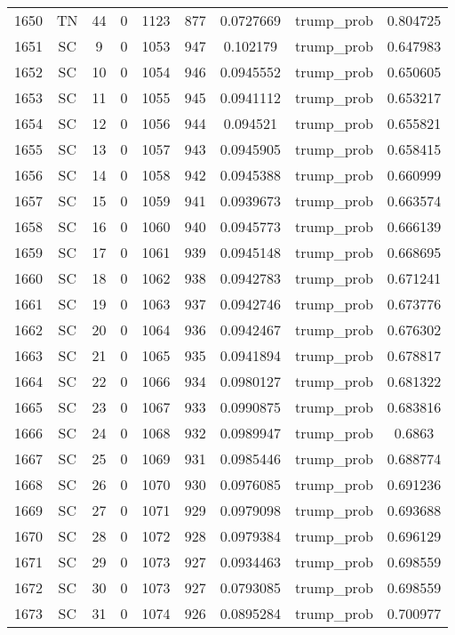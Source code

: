\documentclass[12pt,a4paper]{article}
\begin{document}
\begin{tabular}{r|cccccccc}
	1650 & TN & 44 & 0 & 1123 & 877 & 0.0727669 & trump\_prob & 0.804725 \\
	1651 & SC & 9 & 0 & 1053 & 947 & 0.102179 & trump\_prob & 0.647983 \\
	1652 & SC & 10 & 0 & 1054 & 946 & 0.0945552 & trump\_prob & 0.650605 \\
	1653 & SC & 11 & 0 & 1055 & 945 & 0.0941112 & trump\_prob & 0.653217 \\
	1654 & SC & 12 & 0 & 1056 & 944 & 0.094521 & trump\_prob & 0.655821 \\
	1655 & SC & 13 & 0 & 1057 & 943 & 0.0945905 & trump\_prob & 0.658415 \\
	1656 & SC & 14 & 0 & 1058 & 942 & 0.0945388 & trump\_prob & 0.660999 \\
	1657 & SC & 15 & 0 & 1059 & 941 & 0.0939673 & trump\_prob & 0.663574 \\
	1658 & SC & 16 & 0 & 1060 & 940 & 0.0945773 & trump\_prob & 0.666139 \\
	1659 & SC & 17 & 0 & 1061 & 939 & 0.0945148 & trump\_prob & 0.668695 \\
	1660 & SC & 18 & 0 & 1062 & 938 & 0.0942783 & trump\_prob & 0.671241 \\
	1661 & SC & 19 & 0 & 1063 & 937 & 0.0942746 & trump\_prob & 0.673776 \\
	1662 & SC & 20 & 0 & 1064 & 936 & 0.0942467 & trump\_prob & 0.676302 \\
	1663 & SC & 21 & 0 & 1065 & 935 & 0.0941894 & trump\_prob & 0.678817 \\
	1664 & SC & 22 & 0 & 1066 & 934 & 0.0980127 & trump\_prob & 0.681322 \\
	1665 & SC & 23 & 0 & 1067 & 933 & 0.0990875 & trump\_prob & 0.683816 \\
	1666 & SC & 24 & 0 & 1068 & 932 & 0.0989947 & trump\_prob & 0.6863 \\
	1667 & SC & 25 & 0 & 1069 & 931 & 0.0985446 & trump\_prob & 0.688774 \\
	1668 & SC & 26 & 0 & 1070 & 930 & 0.0976085 & trump\_prob & 0.691236 \\
	1669 & SC & 27 & 0 & 1071 & 929 & 0.0979098 & trump\_prob & 0.693688 \\
	1670 & SC & 28 & 0 & 1072 & 928 & 0.0979384 & trump\_prob & 0.696129 \\
	1671 & SC & 29 & 0 & 1073 & 927 & 0.0934463 & trump\_prob & 0.698559 \\
	1672 & SC & 30 & 0 & 1073 & 927 & 0.0793085 & trump\_prob & 0.698559 \\
	1673 & SC & 31 & 0 & 1074 & 926 & 0.0895284 & trump\_prob & 0.700977 \\

\end{tabular}
\end{document}
